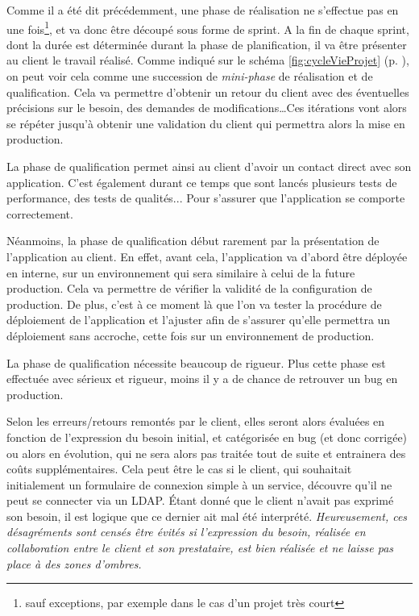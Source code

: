 Comme il a été dit précédemment, une phase de réalisation ne s'effectue pas en une fois\footnote{sauf exceptions, par exemple dans le cas d'un projet très court}, et va donc être découpé sous forme de sprint. A la fin de chaque sprint, dont la durée est déterminée durant la phase de planification, il va être présenter au client le travail réalisé. Comme indiqué sur le schéma \ref{fig:cycleVieProjet} (p. \pageref{fig:cycleVieProjet}), on peut voir cela comme une succession de \emph{mini-phase} de réalisation et de qualification. Cela va permettre d'obtenir un retour du client avec des éventuelles précisions sur le besoin, des demandes de modifications\ldots Ces itérations vont alors se répéter jusqu'à obtenir une validation du client qui permettra alors la mise en production.

La phase de qualification permet ainsi au client d'avoir un contact direct avec son application. C'est également durant ce temps que sont lancés plusieurs tests de performance, des tests de qualités... Pour s'assurer que l'application se comporte correctement.

Néanmoins, la phase de qualification début rarement par la présentation de l'application au client. En effet, avant cela, l'application va d'abord être déployée en interne, sur un environnement qui sera similaire à celui de la future production. Cela va permettre de vérifier la validité de la configuration de production. De plus, c'est à ce moment là que l'on va tester la procédure de déploiement de l'application et l'ajuster afin de s'assurer qu'elle permettra un déploiement sans accroche, cette fois sur un environnement de production.

La phase de qualification nécessite beaucoup de rigueur. Plus cette phase est effectuée avec sérieux et rigueur, moins il y a de chance de retrouver un bug en production.

Selon les erreurs/retours remontés par le client, elles seront alors évaluées en fonction de l'expression du besoin initial, et catégorisée en bug (et donc corrigée) ou alors en évolution, qui ne sera alors pas traitée tout de suite et entrainera des coûts supplémentaires. Cela peut être le cas si le client, qui souhaitait initialement un formulaire de connexion simple à un service, découvre qu'il ne peut se connecter via un \gls{LDAP}. Étant donné que le client n'avait pas exprimé son besoin, il est logique que ce dernier ait mal été interprété. \emph{Heureusement, ces désagréments sont censés être évités si l'expression du besoin, réalisée en collaboration entre le client et son prestataire, est bien réalisée et ne laisse pas place à des zones d'ombres.}

